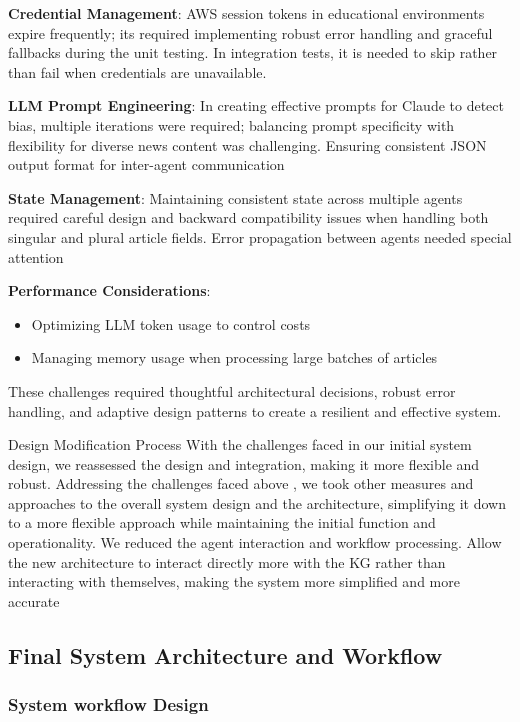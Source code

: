 \documentclass{scrartcl}
\begin{document}
\textbf{Credential Management}: AWS session tokens in educational environments expire frequently; its required implementing robust error handling and graceful fallbacks during the unit testing. In integration tests, it is needed to skip rather than fail when credentials are unavailable.

\textbf{LLM Prompt Engineering}: In creating effective prompts for Claude to detect bias, multiple iterations were required; balancing prompt specificity with flexibility for diverse news content was challenging. Ensuring consistent JSON output format for inter-agent communication

\textbf{State Management}: Maintaining consistent state across multiple agents required careful design and backward compatibility issues when handling both singular and plural article fields. Error propagation between agents needed special attention


\textbf{Performance Considerations}: 
\begin{itemize}
    \item Optimizing LLM token usage to control costs
    \item Managing memory usage when processing large batches of articles
\end{itemize}
These challenges required thoughtful architectural decisions, robust error handling, and adaptive design patterns to create a resilient and effective system.

{Design Modification Process}
With the challenges faced in our initial system design, we reassessed the design and integration, making it more flexible and robust. Addressing the challenges faced above , we took other measures and approaches to the overall system design and the architecture, simplifying it down to a more flexible approach while maintaining the initial function and operationality. We reduced the agent interaction and workflow processing. Allow the new architecture to interact directly more with the KG rather than interacting with themselves, making the system more simplified and more accurate  

\subsection{Final System Architecture and Workflow}
\subsubsection{System workflow Design}
\end{document}
